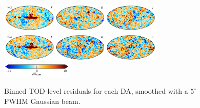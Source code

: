 \documentclass[twocolumn]{../../common/aa}
\begin{document}
\begin{figure}
	\includegraphics[width=0.7\textwidth]{figures/tod_res_W3_IQU.pdf}\\
	\includegraphics[width=0.7\textwidth]{figures/tod_res_W4_IQU.pdf}\\
	\includegraphics[width=0.30\textwidth]{figures/cbar_10uK.pdf}
	\caption{Binned TOD-level residuals for each DA, smoothed with a $5^\circ$ FWHM Gaussian beam.}
        \label{fig:todres}
\end{figure}
\end{document}
